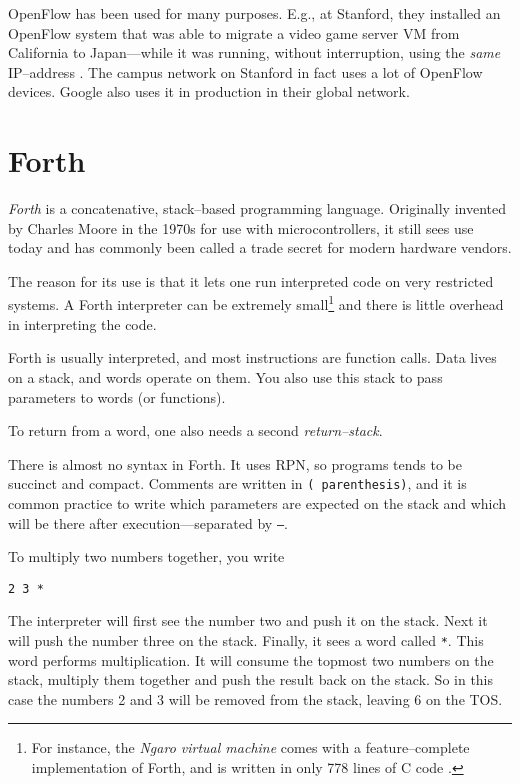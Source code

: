 OpenFlow has been used for many purposes.  E.g., at Stanford, they installed
an OpenFlow system that was able to migrate a video game server \ac{VM} from
California to Japan---while it was running, without interruption, using the
\textit{same} IP--address \cite{erickson2008demonstration}
\cite{kobayashi2013maturing}.
The campus network on Stanford in fact uses a lot of OpenFlow devices.
Google also uses it in production in their global network.

\section{Forth}

\textit{Forth} is a concatenative, stack--based programming language.
Originally invented by Charles Moore in the 1970s for use with
microcontrollers, it still sees use today and has commonly been called a
trade secret for modern hardware vendors.

The reason for its use is that it lets one run interpreted code on very
restricted systems. A Forth interpreter can be extremely small\footnote{For
instance, the \textit{Ngaro virtual machine} comes with a feature--complete
implementation of Forth, and is written in only 778 lines of C code
\cite{ngaro.vm.core}.}
and there is little overhead in interpreting the code.

Forth is usually interpreted, and most instructions are function calls.
Data lives on a stack, and words operate on them.  You also use this stack
to pass parameters to words (or functions).

To return from a word, one also needs a second \textit{return--stack}.

There is almost no syntax in Forth.  It uses \ac{RPN}, so programs tends to
be succinct and compact.  Comments are written in \texttt{( parenthesis)},
and it is common practice to write which parameters are expected on the
stack and which will be there after execution---separated by \texttt{--}.

To multiply two numbers together, you write

\begin{verbatim}
2 3 *
\end{verbatim}

The interpreter will first see the number two and push it on the stack. Next
it will push the number three on the stack. Finally, it sees a word called
\texttt{*}.  This word performs multiplication. It will consume the topmost
two numbers on the stack, multiply them together and push the result back on
the stack. So in this case the numbers 2 and 3 will be removed from the
stack, leaving 6 on the \ac{TOS}.

